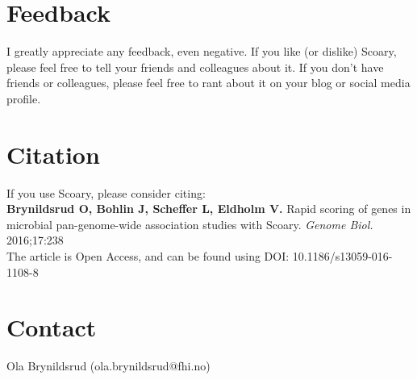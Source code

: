 \documentclass{article}
\begin{document}
  \section{Feedback}
    I greatly appreciate any feedback, even negative. If you like (or dislike) Scoary, please feel free to tell your friends and colleagues about it. If you don't have friends or colleagues, please feel free to rant about it on your blog or social media profile. \\

  \section{Citation}
    If you use Scoary, please consider citing: \\
    
    \textbf{Brynildsrud O, Bohlin J, Scheffer L, Eldholm V.} Rapid scoring of genes in microbial pan-genome-wide association studies with Scoary. \textit{Genome Biol.} 2016;17:238 \\

    The article is Open Access, and can be found using DOI: 10.1186/s13059-016-1108-8 \\

  \section{Contact}
    Ola Brynildsrud (ola.brynildsrud@fhi.no) \\

  
  
\end{document}
